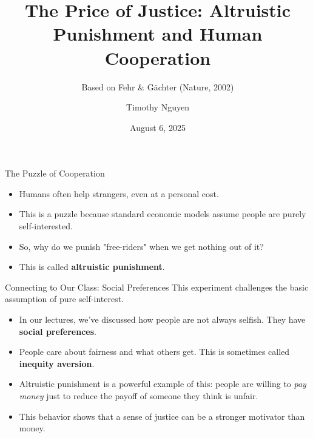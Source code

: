 \documentclass{beamer}
\title[Altruistic Punishment]{The Price of Justice: Altruistic Punishment and Human Cooperation}
\subtitle{Based on Fehr \& Gächter (Nature, 2002)}
\author{Timothy Nguyen}
\institute{EC323: Behavioral Economics \\ Professor Jawwad Noor}
\date{August 6, 2025}
\begin{document}
\begin{frame}
\maketitle
\end{frame}

\begin{frame}{The Puzzle of Cooperation}
    \begin{itemize}
        \item<1-> Humans often help strangers, even at a personal cost.
        \pause
        \item<2-> This is a puzzle because standard economic models assume people are purely self-interested.
        \pause
        \item<3-> So, why do we punish "free-riders" when we get nothing out of it?
        \pause
        \item<4-> This is called \textbf{altruistic punishment}.
    \end{itemize}
\end{frame}

\begin{frame}{Connecting to Our Class: Social Preferences}
    This experiment challenges the basic assumption of pure self-interest.
    \begin{itemize}
        \item<1-> In our lectures, we've discussed how people are not always selfish. They have \textbf{social preferences}.
        \pause
        \item<2-> People care about fairness and what others get. This is sometimes called \textbf{inequity aversion}.
        \pause
        \item<3-> Altruistic punishment is a powerful example of this: people are willing to \textit{pay money} just to reduce the payoff of someone they think is unfair.
        \pause
        \item<4-> This behavior shows that a sense of justice can be a stronger motivator than money.
    \end{itemize}
\end{frame}
\end{document}
